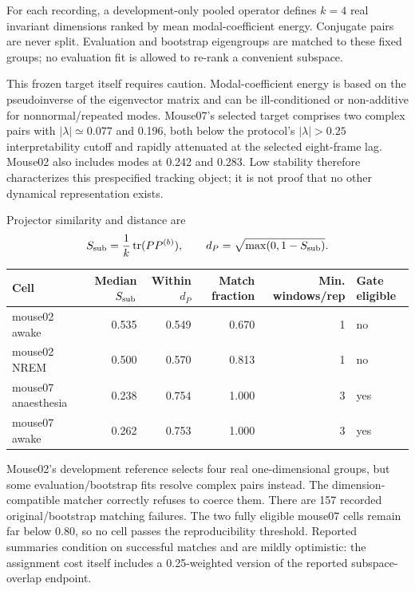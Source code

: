 \documentclass[11pt,a4paper]{article}
\DeclareMathOperator{\tr}{tr}
\begin{document}
For each recording, a development-only pooled operator defines $k=4$ real
invariant dimensions ranked by mean modal-coefficient energy. Conjugate pairs
are never split. Evaluation and bootstrap eigengroups are matched to these fixed
groups; no evaluation fit is allowed to re-rank a convenient subspace.

This frozen target itself requires caution. Modal-coefficient energy is based on
the pseudoinverse of the eigenvector matrix and can be ill-conditioned or
non-additive for nonnormal/repeated modes. Mouse07's selected target comprises
two complex pairs with $|\lambda|\simeq0.077$ and 0.196, both below the
protocol's $|\lambda|>0.25$ interpretability cutoff and rapidly attenuated at
the selected eight-frame lag. Mouse02 also includes modes at 0.242 and 0.283.
Low stability therefore characterizes this prespecified tracking object; it is
not proof that no other dynamical representation exists.

Projector similarity and distance are
\begin{equation}
 S_{\rm sub}=\frac{1}{k}\tr(PP^{(b)}),
 \qquad
 d_P=\sqrt{\max(0,1-S_{\rm sub})}.
\end{equation}

\begin{center}
\scriptsize
\begin{tabular}{@{}lrrrrl@{}}
\toprule
Cell & Median $S_{\rm sub}$ & Within $d_P$ & Match fraction & Min. windows/rep & Gate eligible\\
\midrule
mouse02 awake & 0.535 & 0.549 & 0.670 & 1 & no\\
mouse02 NREM & 0.500 & 0.570 & 0.813 & 1 & no\\
mouse07 anaesthesia & 0.238 & 0.754 & 1.000 & 3 & yes\\
mouse07 awake & 0.262 & 0.753 & 1.000 & 3 & yes\\
\bottomrule
\end{tabular}
\end{center}

Mouse02's development reference selects four real one-dimensional groups, but
some evaluation/bootstrap fits resolve complex pairs instead. The
dimension-compatible matcher correctly refuses to coerce them. There are 157
recorded original/bootstrap matching failures. The two fully eligible mouse07
cells remain far below 0.80, so no cell passes the reproducibility threshold.
Reported summaries condition on successful matches and are mildly optimistic:
the assignment cost itself includes a 0.25-weighted version of the reported
subspace-overlap endpoint.
\end{document}

